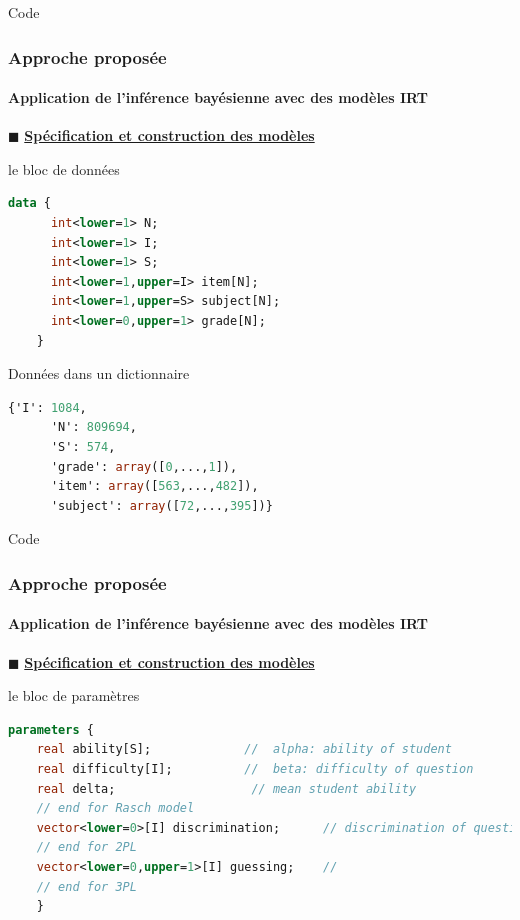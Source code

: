 \documentclass[aspectratio=169,professionalfonts, 12pt]{beamer}
\begin{document}
\begin{frame}{Code}
  \frametitle{Approche proposée}
  \framesubtitle{Application de l'inférence bayésienne avec des modèles IRT}
  \(\displaystyle \blacksquare \) \textbf{\underline{Spécification et construction des modèles}}
  \begin{minipage}{0.48\textwidth}
    \begin{block}{le bloc de données}
    \begin{lstlisting}[language=Stan,basicstyle=\scriptsize,tabsize=1,framesep=0pt,framexleftmargin=0pt,xleftmargin=0pt,xrightmargin=0pt,breakindent=0pt,resetmargins=true]
    data {
      int<lower=1> N;
      int<lower=1> I;
      int<lower=1> S;
      int<lower=1,upper=I> item[N];
      int<lower=1,upper=S> subject[N];
      int<lower=0,upper=1> grade[N];
    }
    \end{lstlisting}
    \end{block}
  \end{minipage}
  \begin{minipage}{1mm}
  \hspace{1mm}
  \end{minipage}
  \begin{minipage}{0.48\textwidth}
    \begin{block}{Données dans un dictionnaire}
    \begin{lstlisting}[language=Stan,basicstyle=\scriptsize,tabsize=1,framesep=0pt,framexleftmargin=0pt,xleftmargin=0pt,xrightmargin=0pt,breakindent=0pt,resetmargins=true]
      {'I': 1084,
      'N': 809694,
      'S': 574,
      'grade': array([0,...,1]),
      'item': array([563,...,482]),
      'subject': array([72,...,395])}
      \end{lstlisting}
    \end{block}
  \end{minipage}	
\end{frame}


\begin{frame}[fragile]{Code}
  \frametitle{Approche proposée}
  \framesubtitle{Application de l'inférence bayésienne avec des modèles IRT}
  \justifying 
  \(\displaystyle \blacksquare \) \textbf{\underline{Spécification et construction des modèles}}
  \begin{minipage}{\textwidth}
  \begin{block}{le bloc de paramètres}
    \begin{lstlisting}[language=Stan,basicstyle=\scriptsize,framesep=4.5mm,framexleftmargin=2.5mm,tabsize=2]
    parameters {
    real ability[S];             //  alpha: ability of student
    real difficulty[I];          //  beta: difficulty of question
    real delta;                   // mean student ability
    // end for Rasch model
    vector<lower=0>[I] discrimination;      // discrimination of question
    // end for 2PL
    vector<lower=0,upper=1>[I] guessing;    //
    // end for 3PL
    }
    \end{lstlisting}
  \end{block}
  \end{minipage}
\end{frame}
\end{document}
